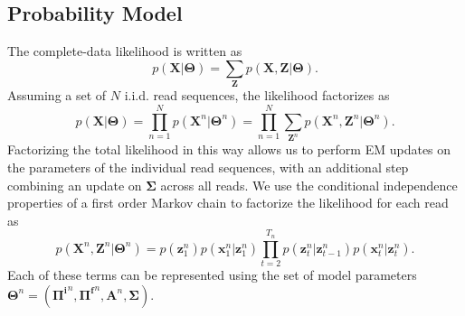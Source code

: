 \documentclass[10pt]{article}
\begin{document}
\subsection{Probability Model}
The complete-data likelihood is written as
\begin{equation}
p(\mathbf{X}|\mathbf{\Theta}) = \displaystyle\sum_{\mathbf{Z}}p(\mathbf{X},\mathbf{Z}|\mathbf{\Theta}).
\end{equation}
Assuming a set of $N$ i.i.d. read sequences, the likelihood factorizes as
\begin{equation}
p(\mathbf{X}|\mathbf{\Theta}) = \displaystyle\prod_{n=1}^{N}p(\mathbf{X}^n|\mathbf{\Theta}^n) = \displaystyle\prod_{n=1}^N\sum_{\mathbf{Z}^n}p(\mathbf{X}^n,\mathbf{Z}^n|\mathbf{\Theta}^n).
\end{equation}
Factorizing the total likelihood in this way allows us to perform EM updates on the parameters of the individual read sequences, with an additional step combining an update on $\mathbf{\Sigma}$ across all reads. We use the conditional independence properties of a first order Markov chain to factorize the likelihood for each read as
\begin{equation}
p(\mathbf{X}^n,\mathbf{Z}^n|\mathbf{\Theta}^n) = p(\mathbf{z}_1^n)p(\mathbf{x}_1^n|\mathbf{z}_1^n)\displaystyle\prod_{t=2}^{T_n}p(\mathbf{z}_{t}^n|\mathbf{z}_{t-1}^{n})p(\mathbf{x}_t^n|\mathbf{z}_t^n).
\end{equation}
Each of these terms can be represented using the set of model parameters $\mathbf{\Theta}^n=(\mathbf{\Pi^i}^n,\mathbf{\Pi^f}^n,\mathbf{A}^n,\mathbf{\Sigma})$.
\end{document}
